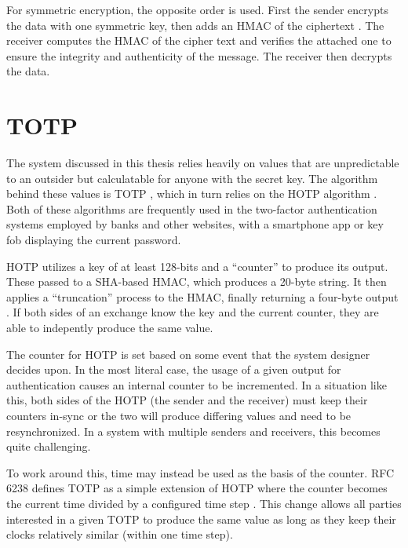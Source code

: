 \par For symmetric encryption, the opposite order is used. First the sender encrypts the data with one symmetric key, then adds an \ac{HMAC} of the ciphertext \cite{AuthEncrypt}. The receiver computes the \ac{HMAC} of the cipher text and verifies the attached one to ensure the integrity and authenticity of the message. The receiver then decrypts the data.

\section{\acf{TOTP}}
\label{sec:totp}
\par The system discussed in this thesis relies heavily on values that are unpredictable to an outsider but calculatable for anyone with the secret key. The algorithm behind these values is \ac{TOTP} \cite{rfc6238}, which in turn relies on the \ac{HOTP} algorithm \cite{rfc4226}. Both of these algorithms are frequently used in the two-factor authentication systems employed by banks and other websites, with a smartphone app or key fob displaying the current password.

\par \ac{HOTP} utilizes a key of at least 128-bits and a ``counter'' to produce its output. These passed to a \ac{SHA}-based \ac{HMAC}, which produces a 20-byte string. It then applies a ``truncation'' process to the \ac{HMAC}, finally returning a four-byte output \cite{rfc4226}. If both sides of an exchange know the key and the current counter, they are able to indepently produce the same value.

\par The counter for \ac{HOTP} is set based on some event that the system designer decides upon. In the most literal case, the usage of a given output for authentication causes an internal counter to be incremented. In a situation like this, both sides of the HOTP (the sender and the receiver) must keep their counters in-sync or the two will produce differing values and need to be resynchronized. In a system with multiple senders and receivers, this becomes quite challenging.

\par To work around this, time may instead be used as the basis of the counter. RFC 6238 defines \ac{TOTP} as a simple extension of \ac{HOTP} where the counter becomes the current time divided by a configured time step \cite{rfc6238}. This change allows all parties interested in a given \ac{TOTP} to produce the same value as long as they keep their clocks relatively similar (within one time step). 

